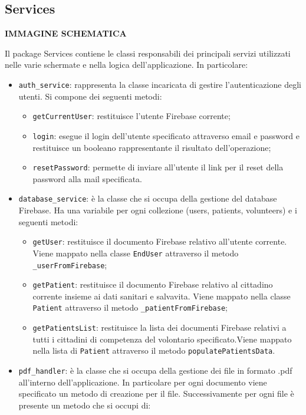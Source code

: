 \documentclass[12pt,a4paper,twoside,openright,titlepage]{book}
\begin{document}
\subsection{Services}
\textbf{IMMAGINE SCHEMATICA}\newline

Il package Services contiene le classi responsabili dei principali servizi utilizzati nelle varie schermate e nella logica dell'applicazione. In particolare:
\begin{itemize}
\item \texttt{auth\_service}: rappresenta la classe incaricata di gestire l'autenticazione degli utenti. Si compone dei seguenti metodi:
\begin{itemize}
\item \texttt{getCurrentUser}: restituisce l'utente Firebase corrente;
\item \texttt{login}: esegue il login dell'utente specificato attraverso email e password e restituisce un booleano rappresentante il risultato dell'operazione;
\item \texttt{resetPassword}: permette di inviare all'utente il link per il reset della password alla mail specificata.
\end{itemize}
\item \texttt{database\_service}: è la classe che si occupa della gestione del database Firebase. Ha una variabile per ogni collezione (users, patients, volunteers) e i seguenti metodi:
\begin{itemize}
\item \texttt{getUser}: restituisce il documento Firebase relativo all'utente corrente. Viene mappato nella classe \texttt{EndUser} attraverso il metodo \texttt{\_userFromFirebase};
\item \texttt{getPatient}: restituisce il documento Firebase relativo al cittadino corrente insieme ai dati sanitari e salvavita. Viene mappato nella classe \texttt{Patient} attraverso il metodo \texttt{\_patientFromFirebase};
\item \texttt{getPatientsList}: restituisce la lista dei documenti Firebase relativi a tutti i cittadini di competenza del volontario specificato.Viene mappato nella lista di \texttt{Patient} attraverso il metodo \texttt{populatePatientsData}.
\end{itemize}
\item \texttt{pdf\_handler}: è la classe che si occupa della gestione dei file in formato .pdf all'interno dell'applicazione. In particolare per ogni documento viene specificato un metodo di creazione per il file. Successivamente per ogni file è presente un metodo che si occupi di:

\end{itemize}
\end{document}
